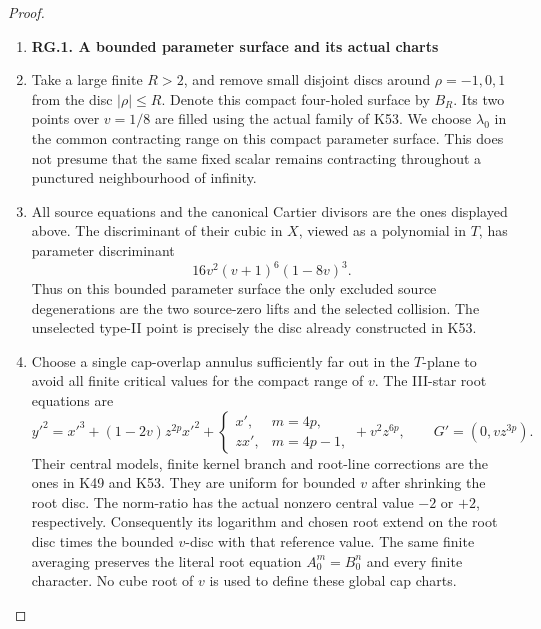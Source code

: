 \begin{proof}
\begin{enumerate}[label=\arabic*.]
\item \par

\medskip\noindent\textbf{RG.1. A bounded parameter surface and its actual charts}

\par\nobreak

\item Take a large finite \(R>2\), and remove small disjoint discs around
\(\rho=-1,0,1\) from the disc \(|\rho|\le R\). Denote this compact
four-holed surface by \(B_R\). Its two points over \(v=1/8\) are
filled using the actual family of K53. We choose \(\lambda_0\) in
the common contracting range on this compact parameter surface.
This does not presume that the same fixed scalar remains
contracting throughout a punctured neighbourhood of infinity.

\item All source equations and the canonical Cartier divisors are the
ones displayed above. The discriminant of their cubic in \(X\),
viewed as a polynomial in \(T\), has parameter discriminant
\[
 16v^2(v+1)^6(1-8v)^3.
\]
Thus on this bounded parameter surface the only excluded source
degenerations are the two source-zero lifts and the selected
collision. The unselected type-II point is precisely the disc
already constructed in K53.

\item Choose a single cap-overlap annulus sufficiently far out in the
\(T\)-plane to avoid all finite critical values for the compact
range of \(v\). The III-star root equations are
\[
 y'^2=x'^3+(1-2v)z^{2p}x'^2+
 \begin{cases}x',&m=4p,\\zx',&m=4p-1,\end{cases}
 +v^2z^{6p},\qquad G'=(0,vz^{3p}).
\]
Their central models, finite kernel branch and root-line
corrections are the ones in K49 and K53. They are uniform for
bounded \(v\) after shrinking the root disc. The norm-ratio has
the actual nonzero central value \(-2\) or \(+2\), respectively.
Consequently its logarithm and chosen root extend on the root
disc times the bounded \(v\)-disc with that reference value.
The same finite averaging preserves the literal root equation
\(A_0^m=B_0^n\) and every finite character. No cube root of \(v\)
is used to define these global cap charts.


\end{enumerate}
\end{proof}
